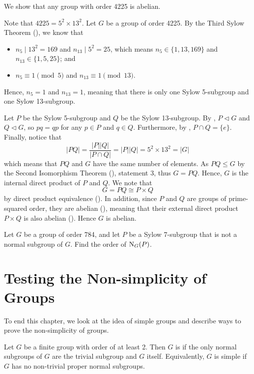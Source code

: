 \begin{example}
    We show that any group with order 4225 is abelian.

    Note that $4225 = 5^2 \times 13^2$. Let $G$ be a group of order 4225. By the Third Sylow Theorem (), we know that
    \begin{itemize}
        \item $n_5 \mid 13^2 = 169$ and $n_{13} \mid 5^2 = 25$, which means $n_5 \in \{1, 13, 169\}$ and $n_{13} \in \{1, 5, 25\}$; and
        \item $n_5 \equiv 1 \pmod 5$ and $n_{13} \equiv 1 \pmod{13}$.
    \end{itemize}
    Hence, $n_5 = 1$ and $n_{13} = 1$, meaning that there is only one Sylow 5-subgroup and one Sylow 13-subgroup.

    Let $P$ be the Sylow 5-subgroup and $Q$ be the Sylow 13-subgroup. By , $P \lhd G$ and $Q \lhd G$, so $pq = qp$ for any $p \in P$ and $q \in Q$. Furthermore, by , $P \cap Q = \{e\}$. Finally, notice that
    \[
        |PQ| = \frac{|P||Q|}{|P\cap Q|} = |P||Q| = 5^2\times13^2 = |G|
    \]
    which means that $PQ$ and $G$ have the same number of elements. As $PQ \leq G$ by the Second Isomorphism Theorem (), statement 3, thus $G = PQ$. Hence, $G$ is the internal direct product of $P$ and $Q$. We note that
    \[
        G = PQ \cong P\times Q
    \]
    by direct product equivalence (). In addition, since $P$ and $Q$ are groups of prime-squared order, they are abelian (), meaning that their external direct product $P\times Q$ is also abelian (). Hence $G$ is abelian.
\end{example}

\begin{exercise}
    Let $G$ be a group of order 784, and let $P$ be a Sylow 7-subgroup that is not a normal subgroup of $G$. Find the order of $\mathrm{N}_{G}(P)$.
\end{exercise}

\section{Testing the Non-simplicity of Groups}
To end this chapter, we look at the idea of simple groups and describe ways to prove the non-simplicity of groups.
\begin{definition}
    Let $G$ be a finite group with order of at least 2. Then $G$ is  if the only normal subgroups of $G$ are the trivial subgroup and $G$ itself. Equivalently, $G$ is simple if $G$ has no non-trivial proper normal subgroups.
\end{definition}

